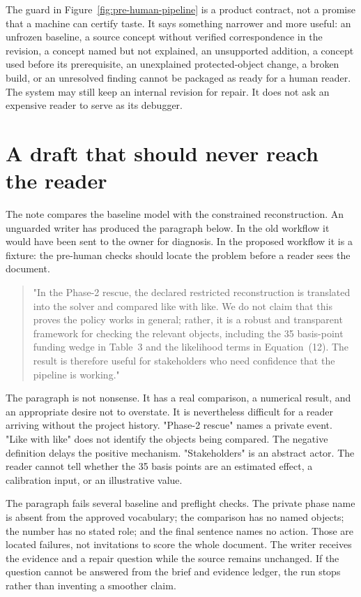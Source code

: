 The guard in Figure~\ref{fig:pre-human-pipeline} is a product contract, not a
promise that a machine can certify taste. It says something narrower and more
useful: an unfrozen baseline, a source concept without verified correspondence in
the revision, a concept named but not explained, an unsupported addition, a
concept used before its prerequisite, an unexplained protected-object change, a
broken build, or an unresolved finding cannot be packaged as ready for a human
reader. The system may still keep an internal revision for repair. It does not
ask an expensive reader to serve as its debugger.

\section{A draft that should never reach the reader}

The note compares the baseline model with the constrained reconstruction. An
unguarded writer has produced the paragraph below. In the old workflow it
would have been sent to the owner for diagnosis. In the proposed workflow it is
a fixture: the pre-human checks should locate the problem before a reader sees
the document.

\begin{quote}\small
"In the Phase-2 rescue, the declared restricted reconstruction is translated
into the solver and compared like with like. We do not claim that this proves
the policy works in general; rather, it is a robust and transparent framework
for checking the relevant objects, including the 35 basis-point funding wedge
in Table~3 and the likelihood terms in Equation~(12). The result is therefore
useful for stakeholders who need confidence that the pipeline is working."
\end{quote}

The paragraph is not nonsense. It has a real comparison, a numerical result,
and an appropriate desire not to overstate. It is nevertheless difficult for a
reader arriving without the project history. "Phase-2 rescue" names a private
event. "Like with like" does not identify the objects being compared. The
negative definition delays the positive mechanism. "Stakeholders" is an
abstract actor. The reader cannot tell whether the 35 basis points are an
estimated effect, a calibration input, or an illustrative value.

The paragraph fails several baseline and preflight checks. The private phase
name is absent from the approved vocabulary; the comparison has no named
objects; the number has no stated role; and the final sentence names no action.
Those are located failures, not invitations to score the whole document. The
writer receives the evidence and a repair question while the source remains
unchanged. If the question cannot be answered from the brief and evidence
ledger, the run stops rather than inventing a smoother claim.

